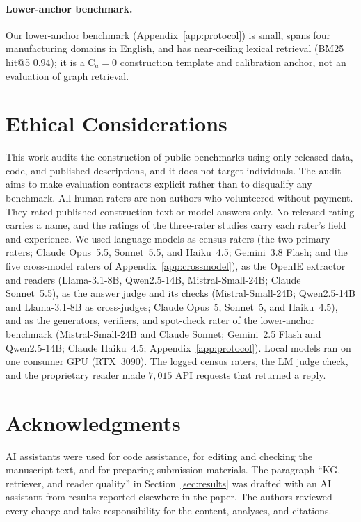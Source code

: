 \documentclass[11pt]{article}
\newcommand{\C}{\mathrm{C}}
\begin{document}
\paragraph{Lower-anchor benchmark.} Our lower-anchor benchmark (Appendix~\ref{app:protocol}) is small, spans four manufacturing domains in English, and has near-ceiling lexical retrieval (BM25 hit@5 $0.94$); it is a $\C_a=0$ construction template and calibration anchor, not an evaluation of graph retrieval.

\section*{Ethical Considerations}
This work audits the construction of public benchmarks using only released data, code, and published descriptions, and it does not target individuals. The audit aims to make evaluation contracts explicit rather than to disqualify any benchmark. All human raters are non-authors who volunteered without payment. They rated published construction text or model answers only. No released rating carries a name, and the ratings of the three-rater studies carry each rater's field and experience. We used language models as census raters (the two primary raters; Claude Opus~5.5, Sonnet~5.5, and Haiku~4.5; Gemini~3.8 Flash; and the five cross-model raters of Appendix~\ref{app:crossmodel}), as the OpenIE extractor and readers (Llama-3.1-8B, Qwen2.5-14B, Mistral-Small-24B; Claude Sonnet~5.5), as the answer judge and its checks (Mistral-Small-24B; Qwen2.5-14B and Llama-3.1-8B as cross-judges; Claude Opus~5, Sonnet~5, and Haiku~4.5), and as the generators, verifiers, and spot-check rater of the lower-anchor benchmark (Mistral-Small-24B and Claude Sonnet; Gemini~2.5 Flash and Qwen2.5-14B; Claude Haiku~4.5; Appendix~\ref{app:protocol}). Local models ran on one consumer GPU (RTX~3090). The logged census raters, the LM judge check, and the proprietary reader made $7{,}015$ API requests that returned a reply.

\section*{Acknowledgments}
AI assistants were used for code assistance, for editing and checking the manuscript text, and for preparing submission materials. The paragraph ``KG, retriever, and reader quality'' in Section~\ref{sec:results} was drafted with an AI assistant from results reported elsewhere in the paper. The authors reviewed every change and take responsibility for the content, analyses, and citations.
\end{document}
